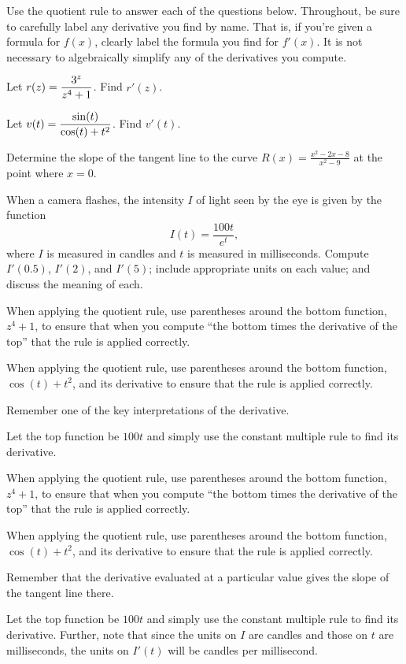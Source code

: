 \begin{activity} \label{A:2.5.2} Use the quotient rule to answer each of the questions below.  Throughout, be sure to carefully label any derivative you find by name.  
That is, if you're given a formula for $f(x)$, clearly label the formula you find for $f'(x)$.  It is not necessary to algebraically simplify any of the derivatives you compute.
\ba
	\item Let $\displaystyle r(z)=\frac{3^z}{z^4 + 1}$.  Find $r'(z)$.
	\item Let $\displaystyle v(t) = \frac{\sin(t)}{\cos(t) + t^2}$.  Find $v'(t)$.
	\item Determine the slope of the tangent line to the curve $\displaystyle R(x) = \frac{x^2 - 2x - 8}{x^2 - 9}$ at the point where $x = 0$.
	\item When a camera flashes, the intensity $I$ of light seen by the eye is given by the function
$$I(t) = \frac{100t}{e^t},$$
where $I$ is measured in candles and $t$ is measured in milliseconds.  Compute $I'(0.5)$, $I'(2)$, and $I'(5)$; include appropriate units on each value; and discuss the meaning of each.
\ea
\end{activity}
\begin{smallhint}
\ba
	\item When applying the quotient rule, use parentheses around the bottom function, $z^4 + 1$, to ensure that when you compute ``the bottom times the derivative of the top'' that the rule is applied correctly.
	\item When applying the quotient rule, use parentheses around the bottom function, $\cos(t) + t^2$, and its derivative to ensure that the rule is applied correctly.
	\item Remember one of the key interpretations of the derivative.
	\item Let the top function be $100t$ and simply use the constant multiple rule to find its derivative.
\ea
\end{smallhint}
\begin{bighint}
\ba
	\item When applying the quotient rule, use parentheses around the bottom function, $z^4 + 1$, to ensure that when you compute ``the bottom times the derivative of the top'' that the rule is applied correctly.
	\item When applying the quotient rule, use parentheses around the bottom function, $\cos(t) + t^2$, and its derivative to ensure that the rule is applied correctly.
	\item Remember that the derivative evaluated at a particular value gives the slope of the tangent line there.
	\item Let the top function be $100t$ and simply use the constant multiple rule to find its derivative.  Further, note that since the units on $I$ are candles and those on $t$ are milliseconds, the units on $I'(t)$ will be candles per millisecond.
\ea
\end{bighint}
